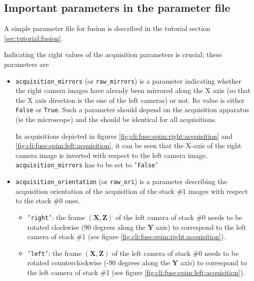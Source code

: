 \subsection{Important parameters in the parameter file}
\label{sec:cli:fuse:important:parameters}

A simple parameter file for fusion is described in the tutorial
section \ref{sec:tutorial:fusion}.

Indicating the right values of the
acquisition parameters is crucial; these parameters are
\begin{itemize}
\itemsep -0.5ex
\item \texttt{acquisition\_mirrors}  (or \texttt{raw\_mirrors}) is a parameter indicating whether the right camera images have already been mirrored along the X axis (so that the X axis direction is the one of the left cameras) or not. Its value is either \texttt{False} or \texttt{True}. Such a parameter should depend on the acquisition apparatus (ie the microscope) and the should be identical for all acquisitions.

In acquisitions depicted in figures \ref{fig:cli:fuse:spim:right:acquisition} and \ref{fig:cli:fuse:spim:left:acquisition}, it can be seen that the X-axis of the right camera image is inverted with respect to the left camera image. \texttt{acquisition\_mirrors} has to be set to \texttt{'False'}
  
  
\item \texttt{acquisition\_orientation} (or \texttt{raw\_ori}) is a parameter describing the acquisition orientation of the acquisition of the stack \#1 images with respect to the stack \#0 ones. 

\begin{itemize}
\itemsep -0.5ex
\item \texttt{'right'}: the frame $(\mathbf{X}, \mathbf{Z})$ of the left camera of stack \#0 needs to be rotated clockwise (90 degrees along the $\mathbf{Y}$ axis) to correspond to the left camera of stack \#1 (see figure \ref{fig:cli:fuse:spim:right:acquisition}).
\item \texttt{'left'}: the frame $(\mathbf{X}, \mathbf{Z})$ of the left camera of stack \#0 needs to be rotated counterclockwise (-90 degrees along the $\mathbf{Y}$ axis) to correspond to the left camera of stack \#1 (see figure \ref{fig:cli:fuse:spim:left:acquisition}).
\end{itemize}


\end{itemize}

